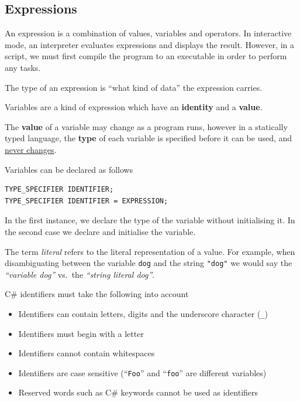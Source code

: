 \documentclass{article}
\begin{document}
\subsection{Expressions}
\begin{definition}[Expressions]
    An expression is a combination of values, variables and operators.
    In interactive mode, an interpreter evaluates expressions and displays the result.
    However, in a script, we must first compile the program to an executable in order
    to perform any tasks.
\end{definition}
\begin{definition}[Type]
    The type of an expression is ``what kind of data'' the expression carries.
\end{definition}
\begin{definition}[Variables]
    Variables are a kind of expression which have an \textbf{identity} and a \textbf{value}.

    The \textbf{value} of a variable may change as a program runs, however in
    a statically typed language, the \textbf{type} of each variable is
    specified before it can be used, and \underline{never changes}.

    Variables can be declared as follows
    \begin{lstlisting}
TYPE_SPECIFIER IDENTIFIER;
TYPE_SPECIFIER IDENTIFIER = EXPRESSION;
    \end{lstlisting}
    In the first instance, we declare the type of the variable without initialising it.
    In the second case we declare and initialise the variable.
\end{definition}
\begin{definition}[Literal]
    The term \textit{literal} refers to the literal representation of a value.
    For example, when disambiguating between the variable \lstinline!dog!
    and the string \lstinline!"dog"! we would say the \emph{``variable dog''} %
    vs.\ the \emph{``string literal dog''}.
\end{definition}
C\# identifiers must take the following into account
\begin{itemize}
    \item Identifiers can contain letters, digits and the underscore character (\lstinline!_!)
    \item Identifiers must begin with a letter
    \item Identifiers cannot contain whitespaces
    \item Identifiers are case sensitive (``\lstinline!Foo!'' and ``\lstinline!foo!'' are different variables) %
    \item Reserved words such as C\# keywords cannot be used as identifiers
\end{itemize}
\end{document}
